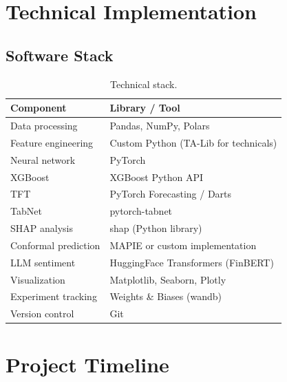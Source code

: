 \documentclass[11pt,a4paper]{article}
\begin{document}
\section{Technical Implementation}

\subsection{Software Stack}

\begin{table}[H]
\centering
\begin{tabular}{@{}ll@{}}
\toprule
\textbf{Component} & \textbf{Library / Tool} \\
\midrule
Data processing & Pandas, NumPy, Polars \\
Feature engineering & Custom Python (TA-Lib for technicals) \\
Neural network & PyTorch \\
XGBoost & XGBoost Python API \\
TFT & PyTorch Forecasting / Darts \\
TabNet & pytorch-tabnet \\
SHAP analysis & shap (Python library) \\
Conformal prediction & MAPIE or custom implementation \\
LLM sentiment & HuggingFace Transformers (FinBERT) \\
Visualization & Matplotlib, Seaborn, Plotly \\
Experiment tracking & Weights \& Biases (wandb) \\
Version control & Git \\
\bottomrule
\end{tabular}
\caption{Technical stack.}
\end{table}


\section{Project Timeline}
\end{document}
